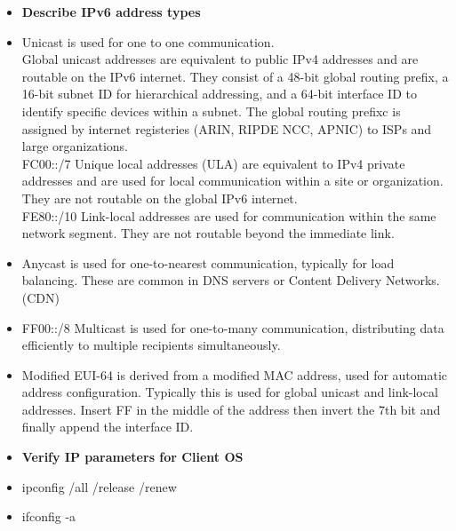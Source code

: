 \documentclass{article}
\begin{document}
\begin{itemize}
  \item \textbf{Describe IPv6 address types}
  	\item[] Unicast is used for one to one communication.\\
		Global unicast addresses are equivalent to public IPv4 addresses and are routable on the IPv6 internet. They consist of a 48-bit global routing prefix, a 16-bit subnet ID for hierarchical addressing, and a 64-bit interface ID to identify specific devices within a subnet. The global routing prefixc is assigned by internet registeries (ARIN, RIPDE NCC, APNIC) to ISPs and large organizations.\\
		FC00::/7 Unique local addresses (ULA) are equivalent to IPv4 private addresses and are used for local communication within a site or organization. They are not routable on the global IPv6 internet.\\
		FE80::/10 Link-local addresses are used for communication within the same network segment. They are not routable beyond the immediate link. \\
	\item[] Anycast is used for one-to-nearest communication, typically for load balancing. These are common in DNS servers or Content Delivery Networks. (CDN)\\
	\item[] FF00::/8 Multicast is used for one-to-many communication, distributing data efficiently to multiple recipients simultaneously.\\
	\item[] Modified EUI-64 is derived from a modified MAC address, used for automatic address configuration. Typically this is used for global unicast and link-local addresses. Insert FF in the middle of the address then invert the 7th bit and finally append the interface ID.\\
  
  \item \textbf{Verify IP parameters for Client OS}
  	\item[] ipconfig /all /release /renew
  	\item[] ifconfig -a
  

\end{itemize}
\end{document}
